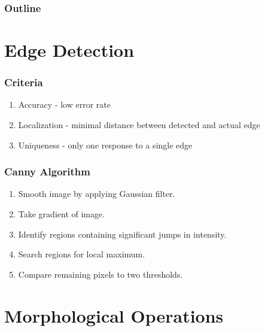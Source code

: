 \documentclass{beamer}
\begin{document}
\begin{frame}
  \frametitle{Outline}
  \tableofcontents[hideallsubsections]
\end{frame}

\section[Edge Detection]{Edge Detection}

\begin{frame}
\frametitle{Criteria}
\begin{enumerate}
\item Accuracy - low error rate
\linebreak
\item Localization - minimal distance between detected and actual edge
\linebreak
\item Uniqueness - only one response to a single edge
\end{enumerate}
\end{frame}

\begin{frame}
\frametitle{Canny Algorithm}
\begin{enumerate}
\item Smooth image by applying Gaussian filter.
\linebreak
\item Take gradient of image.
\linebreak
\item Identify regions containing significant jumps in intensity.
\linebreak
\item Search regions for local maximum.
\linebreak
\item Compare remaining pixels to two thresholds.
\end{enumerate}
\end{frame}

\section[Morphological Operations]{Morphological Operations}
\end{document}

